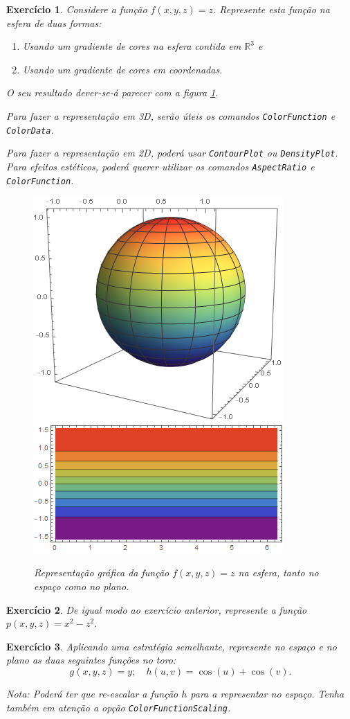 \documentclass{article}
\newtheorem{ex}{Exercício}
\newcommand{\R}{\mathbb{R}}
\begin{document}
\begin{ex}
Considere a função $f(x,y,z) = z$. Represente esta função na esfera de duas formas:
\begin{enumerate}
\item Usando um gradiente de cores na esfera contida em $\R^3$ e
\item Usando um gradiente de cores em coordenadas.
\end{enumerate}

O seu resultado dever-se-á parecer com a figura \ref{spfunc}.

Para fazer a representação em 3D, serão úteis os comandos \texttt{ColorFunction} e \texttt{ColorData}.

Para fazer a representação em 2D, poderá usar \texttt{ContourPlot} ou \texttt{DensityPlot}. Para efeitos estéticos, poderá querer utilizar os comandos \texttt{AspectRatio} e \texttt{ColorFunction}.

\begin{figure}
\centering
\includegraphics[width=.45\textwidth]{spz3d}
\includegraphics[width=.45\textwidth]{spzplane}
\caption{Representação gráfica da função $f(x,y,z) = z$ na esfera, tanto no espaço como no plano.} \label{spfunc}
\end{figure}
\end{ex}

\begin{ex}
De igual modo ao exercício anterior, represente a função $p(x,y,z) = x^2 - z^2$.
\end{ex}

\begin{ex}
Aplicando uma estratégia semelhante, represente no espaço e no plano as duas seguintes funções no toro:
\[g(x,y,z) = y; \quad h(u,v) = \cos(u) + \cos(v).\]

Nota: Poderá ter que re-escalar a função $h$ para a representar no espaço. Tenha também em atenção a opção \texttt{ColorFunctionScaling}.
\end{ex}
\end{document}
